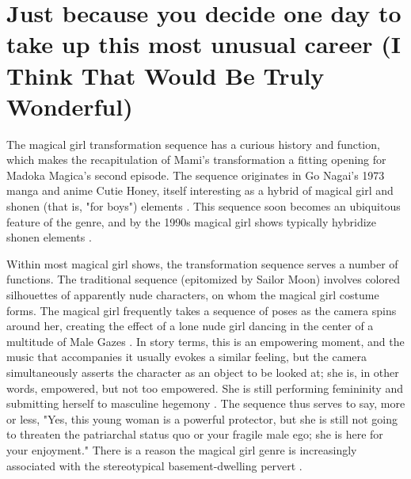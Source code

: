 \chapter{Just because you decide one day to take up this most unusual career (I Think That Would Be Truly Wonderful)}

The magical girl transformation sequence has a curious history and function, which makes the recapitulation of Mami's transformation a fitting opening for Madoka Magica's second episode. The sequence originates in Go Nagai's 1973 manga and anime Cutie Honey, itself interesting as a hybrid of magical girl and shonen (that is, "for boys") elements \cite{ref24}. This sequence soon becomes an ubiquitous feature of the genre, and by the 1990s magical girl shows typically hybridize shonen elements \cite{ref25}. 

Within most magical girl shows, the transformation sequence serves a number of functions. The traditional sequence (epitomized by Sailor Moon) involves colored silhouettes of apparently nude characters, on whom the magical girl costume forms. The magical girl frequently takes a sequence of poses as the camera spins around her, creating the effect of a lone nude girl dancing in the center of a multitude of Male Gazes \cite{ref26}. In story terms, this is an empowering moment, and the music that accompanies it usually evokes a similar feeling, but the camera simultaneously asserts the character as an object to be looked at; she is, in other words, empowered, but not too empowered. She is still performing femininity and submitting herself to masculine hegemony \cite{ref27}. The sequence thus serves to say, more or less, "Yes, this young woman is a powerful protector, but she is still not going to threaten the patriarchal status quo or your fragile male ego; she is here for your enjoyment." There is a reason the magical girl genre is increasingly associated with the stereotypical basement-dwelling pervert \cite{ref28}. 


